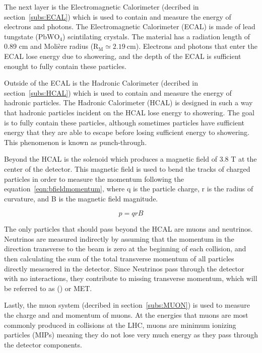 The next layer is the Electromagnetic Calorimeter (decribed in section~\ref{subs:ECAL}) which is used to contain and measure the energy of electrons and photons.
The Electromagnetic Calorimeter (ECAL) is made of lead tungstate ($\mathrm{PbWO_{4}}$) scintilating crystals.
The material has a radiation length of 0.89 cm and Moli\`ere radius ($\mathrm{R_{M} \simeq 2.19~cm}$).
Electrons and photons that enter the ECAL lose energy due to showering, and the depth of the ECAL is sufficient enought to fully contain these particles.

Outside of the ECAL is the Hadronic Calorimeter (decribed in section~\ref{subs:HCAL}) which is used to contain and measure the energy of hadronic particles.
The Hadronic Calorimeter (HCAL) is designed in such a way that hadronic particles incident on the HCAL lose energy to showering.
The goal is to fully contain these particles, although sometimes particles have sufficient energy that they are able to escape before losing sufficient energy to showering.
This phenomenon is known as punch-through.

Beyond the HCAL is the solenoid which produces a magnetic field of 3.8 T at the center of the detector.
This magnetic field is used to bend the tracks of charged particles in order to measure the momentum following the equation~\ref{eqn:bfieldmomentum},
where q is the particle charge, r is the radius of curvature, and B is the magnetic field magnitude.

\begin{equation}
  \label{eqn:bfieldmomentum}
p = qrB
\end{equation}

The only particles that should pass beyond the HCAL are muons and neutrinos.
Neutrinos are measured indirectly by assuming that the momentum in the direction transverse to the beam is zero at the beginning of each collision,
and then calculating the sum of the total transverse momentum of all particles directly measuered in the detector.
Since Neutrinos pass through the detector with no interactions, they contribute to missing transverse momentum, which will be referred to as (\MET) or MET.

Lastly, the muon system (decribed in section~\ref{subs:MUON}) is used to measure the charge and and momentum of muons.
At the energies that muons are most commonly produced in collisions at the LHC, muons are minimum ionizing particles (MIPs)
meaning they do not lose very much energy as they pass through the detector components.


